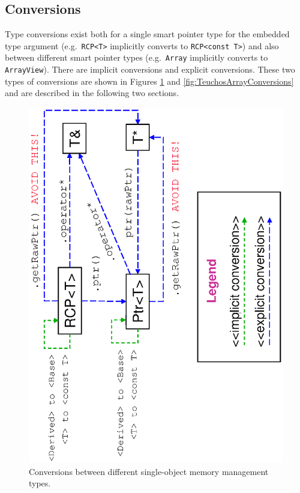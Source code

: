 \documentclass[pdf,ps2pdf,11pt]{SANDreport}
\begin{document}
%
{}\subsection{Conversions}
\label{sec:conversions}
%

Type conversions exist both for a single smart pointer type for the
embedded type argument (e.g.\ {}\texttt{RCP<T>} implicitly converts to
{}\texttt{RCP<const T>}) and also between different smart pointer
types (e.g.\ {}\texttt{Array} implicitly converts to
{}\texttt{ArrayView}).  There are implicit conversions and explicit
conversions.  These two types of conversions are shown in Figures
{}\ref{fig:TeuchosPtrConversions} and
{}\ref{fig:TeuchosArrayConversions} and are described in the following
two sections.


{\bsinglespace
\begin{figure}[p]
\begin{center}
\includegraphics*[angle=270,scale=0.50]{TeuchosPtrConversions}
\end{center}
\caption{
\label{fig:TeuchosPtrConversions}
Conversions between different single-object memory management types.}
\end{figure}
\esinglespace}
\end{document}
